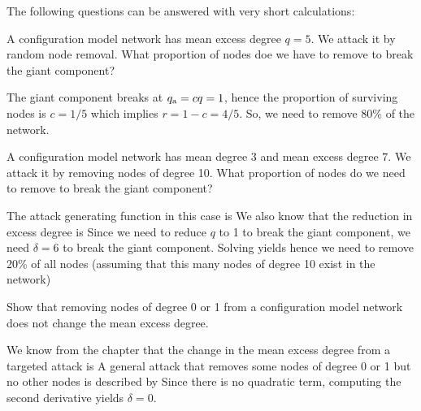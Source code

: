
The following questions can be answered with very short calculations:

\subquestion 
A configuration model network has mean excess degree $q=5$. We attack it by random node removal. What proportion of nodes doe we have to remove to break the giant component?

\solution
The giant component breaks at $q_{\rm a}=cq=1$, hence the proportion of surviving nodes is $c=1/5$ which implies $r=1-c=4/5$. So, we need to remove 80\% of the network.   

\subquestion 
A configuration model network has mean degree $3$ and mean excess degree $7$. We attack it by removing nodes of degree 10.  What proportion of nodes do we need to remove to break the giant component?

\solution 
The attack generating function in this case is 
We also know that the reduction in excess degree is 
Since we need to reduce $q$ to 1 to break the giant component, we need $\delta=6$ to break the giant component. Solving 
yields 
hence we need to remove 20\% of all nodes (assuming that this many nodes of degree 10 exist in the network)

\subquestion
Show that removing nodes of degree 0 or 1 from a configuration model network does not change the mean excess degree. 

\solution
We know from the chapter that the change in the mean excess degree from a targeted attack is 
A general attack that removes some nodes of degree 0 or 1 but no other nodes is described by 
Since there is no quadratic term, computing the second derivative yields  $\delta=0$. 
